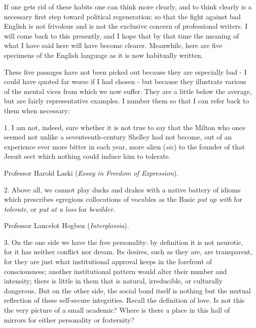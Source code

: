 If one gets rid of these habits one can think more clearly, and to think clearly is a necessary first step toward political regeneration: so that the fight against bad English is not frivolous and is not the exclusive concern of professional writers. I will come back to this presently, and I hope that by that time the meaning of what I have said here will have become clearer. Meanwhile, here are five specimens of the English language as it is now habitually written.\par

These five passages have not been picked out because they are especially bad - I could have quoted far worse if I had chosen - but because they illustrate various of the mental vices from which we now suffer. They are a little below the average, but are fairly representative examples. I number them so that I can refer back to them when necessary:\par

\begin{rquote}
1. I am not, indeed, sure whether it is not true to say that the Milton who once seemed not unlike a seventeenth-century Shelley had not become, out of an experience ever more bitter in each year, more alien (\textit{sic}) to the founder of that Jesuit sect which nothing could induce him to tolerate.
\end{rquote}

\begin{rquote}
Professor Harold Laski (\textit{Essay in Freedom of Expression}).
\end{rquote}

\begin{rquote}
2. Above all, we cannot play ducks and drakes with a native battery of idioms which prescribes egregious collocations of vocables as the Basic \textit{put up with} for \textit{tolerate}, or \textit{put at a loss} for \textit{bewilder}.
\end{rquote}

\begin{rquote}
Professor Lancelot Hogben (\textit{Interglossia}).
\end{rquote}

\begin{rquote}
3. On the one side we have the free personality: by definition it is not neurotic, for it has neither conflict nor dream. Its desires, such as they are, are transparent, for they are just what institutional approval keeps in the forefront of consciousness; another institutional pattern would alter their number and intensity; there is little in them that is natural, irreducible, or culturally dangerous. But on the other side, the social bond itself is nothing but the mutual reflection of these self-secure integrities. Recall the definition of love. Is not this the very picture of a small academic? Where is there a place in this hall of mirrors for either personality or fraternity?
\end{rquote}

